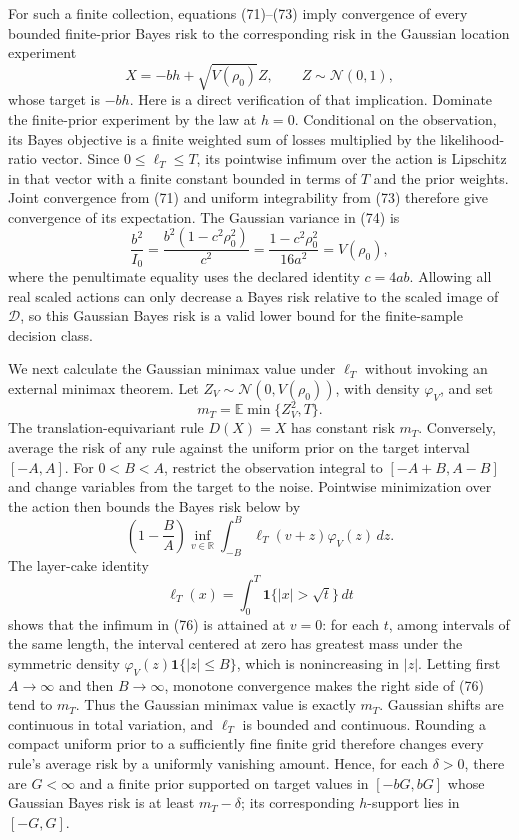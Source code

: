 For such a finite collection, equations (71)--(73) imply convergence
of every bounded finite-prior Bayes risk to the corresponding risk in
the Gaussian location experiment
\[
 X=-bh+\sqrt{V(\rho_0)}Z,
 \qquad Z\sim\mathcal N(0,1),
 \tag{74}
\]
whose target is \(-bh\).  Here is a direct verification of that
implication.  Dominate the finite-prior experiment by the law at
\(h=0\).  Conditional on the observation, its Bayes objective is a
finite weighted sum of losses multiplied by the likelihood-ratio
vector.  Since \(0\le\ell_T\le T\), its pointwise infimum over the
action is Lipschitz in that vector with a finite constant bounded in
terms of \(T\) and the prior weights.  Joint convergence from (71) and
uniform integrability from (73) therefore give convergence of its
expectation.  The Gaussian variance in (74) is
\[
 \frac{b^2}{I_0}
 =\frac{b^2(1-c^2\rho_0^2)}{c^2}
 =\frac{1-c^2\rho_0^2}{16a^2}
 =V(\rho_0),
 \tag{75}
\]
where the penultimate equality uses the declared identity \(c=4ab\).
Allowing all real scaled actions can only decrease a Bayes risk relative
to the scaled image of \(\mathcal D\), so this Gaussian Bayes risk is a
valid lower bound for the finite-sample decision class.

We next calculate the Gaussian minimax value under \(\ell_T\) without
invoking an external minimax theorem.  Let
\(Z_V\sim\mathcal N(0,V(\rho_0))\), with density \(\varphi_V\), and set
\[
 m_T=\mathbb E\min\{Z_V^2,T\}.
\]
The translation-equivariant rule \(D(X)=X\) has constant risk \(m_T\).
Conversely, average the risk of any rule against the uniform prior on
the target interval \([-A,A]\).  For \(0<B<A\), restrict the observation
integral to \([-A+B,A-B]\) and change variables from the target to the
noise.  Pointwise minimization over the action then bounds the Bayes risk
below by
\[
 \left(1-\frac BA\right)
 \inf_{v\in\mathbb R}
 \int_{-B}^{B}\ell_T(v+z)\varphi_V(z)\,dz.
 \tag{76}
\]
The layer-cake identity
\[
 \ell_T(x)=\int_0^T\mathbf 1\{|x|>\sqrt t\}\,dt
\]
shows that the infimum in (76) is attained at \(v=0\): for each
\(t\), among intervals of the same length, the interval centered at zero
has greatest mass under the symmetric density
\(\varphi_V(z)\mathbf 1\{|z|\le B\}\), which is nonincreasing in
\(|z|\).  Letting first \(A\to\infty\) and then \(B\to\infty\), monotone
convergence makes the right side of (76) tend to \(m_T\).  Thus the
Gaussian minimax value is exactly \(m_T\).  Gaussian shifts are
continuous in total variation, and \(\ell_T\) is bounded and continuous.
Rounding a compact uniform prior to a sufficiently fine finite grid
therefore changes every rule's average risk by a uniformly vanishing
amount.  Hence, for each \(\delta>0\), there are \(G<\infty\) and a
finite prior supported on target values in \([-bG,bG]\) whose Gaussian
Bayes risk is at least \(m_T-\delta\); its corresponding \(h\)-support
lies in \([-G,G]\).

